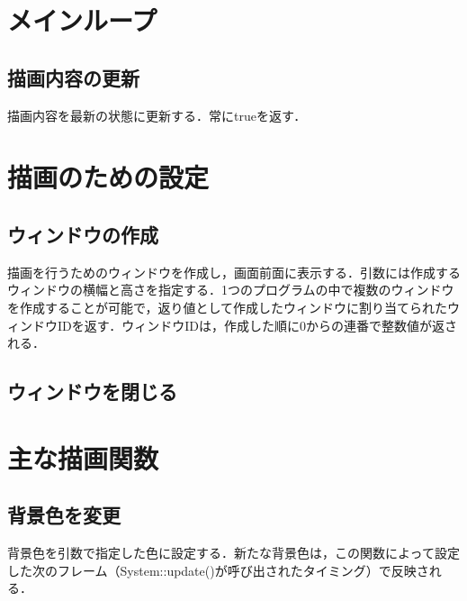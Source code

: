 \documentclass[a4paper, 11pt, oneside, onecolumn, openany]{jsarticle}
\begin{document}
\section{メインループ}
\subsection{描画内容の更新}
描画内容を最新の状態に更新する．常にtrueを返す．\\


\section{描画のための設定}
\subsection{ウィンドウの作成}
描画を行うためのウィンドウを作成し，画面前面に表示する．引数には作成するウィンドウの横幅と高さを指定する．1つのプログラムの中で複数のウィンドウを作成することが可能で，返り値として作成したウィンドウに割り当てられたウィンドウIDを返す．ウィンドウIDは，作成した順に0からの連番で整数値が返される．

\subsection{ウィンドウを閉じる}


\section{主な描画関数}
\subsection{背景色を変更}
背景色を引数で指定した色に設定する．新たな背景色は，この関数によって設定した次のフレーム（System::update()が呼び出されたタイミング）で反映される．
\end{document}

